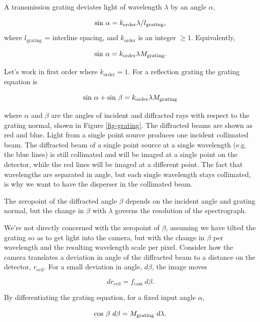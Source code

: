 \documentclass[12pt]{article}
\newcommand{\subscript}[1]{\mathrm{#1}}
\newcommand{\ccd}{\subscript{ccd}}
\newcommand{\cam}{\subscript{cam}}
\newcommand{\grating}{\subscript{grating}}
\newcommand{\order}{\subscript{order}}
\begin{document}
A transmission grating deviates light of wavelength $\lambda$
by an angle $\alpha$,

$$ {\rm sin}~\alpha = k_{\order} \lambda / l_{\grating}, $$
where $l_{\grating}$ = interline spacing, and $k_{\order}$ is an
integer $\geq 1$.  Equivalently,

$$ {\rm sin}~\alpha = k_{\order} \lambda M_{\grating}. $$

Let's work in first order where $k_{\order} = 1$.
For a reflection grating the grating equation is 

$$ {\rm sin}~\alpha + {\rm sin}~\beta = k_{\order} \lambda M_{\grating} $$

where $\alpha$ and $\beta$ are the angles of incident and diffracted rays
with respect to the grating normal, shown in Figure
\ref{fig-grating}.  The diffracted beams are shown as red and blue.
Light from a single point source produces one incident collimated beam.
The diffracted beam of a single point source at a single
wavelength (e.g. the blue lines) is still collimated and will be
imaged at a single point on the detector, while the red lines will
be imaged at a different point.  The fact that wavelengths are
separated in angle, but each single wavelength stays collimated,
is why we want to have the disperser in the collimated beam.

The zeropoint of the diffracted
angle $\beta$ depends on the incident angle and grating normal, 
but the change in $\beta$ with $\lambda$ governs the resolution of 
the spectrograph.  


We're not directly concerned with the zeropoint of $\beta$, assuming
we have tilted the grating so as to get light into the camera,
but with the change in $\beta$ per wavelength and the resulting
wavelength scale per pixel.
Consider how the camera translates a deviation in angle of the
diffracted beam to a distance on the detector, $r_{\ccd}$.  
For a small deviation in angle, $d\beta$, the image moves

$$  dr_{\ccd} = f_{\cam}~ d\beta. $$

By differentiating the grating equation, for a fixed 
input angle $\alpha$, 

$$ {\rm cos}~\beta~d\beta = M_{\grating}~d\lambda.$$
\end{document}
